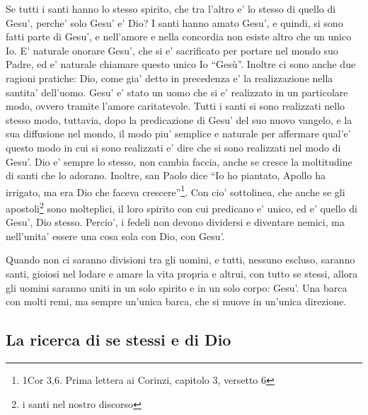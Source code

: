Se tutti i santi hanno lo stesso spirito, che tra l'altro e' lo stesso di quello di Gesu', perche' solo Gesu' e' Dio? 
I santi hanno amato Gesu', e quindi, si sono fatti parte di Gesu', e nell'amore e nella concordia non esiste altro che un unico Io. E' naturale onorare Gesu', che si e' sacrificato per portare nel mondo suo Padre, ed e' naturale chiamare questo unico Io ``Gesù''. Inoltre ci sono anche due ragioni pratiche: Dio, come gia' detto in precedenza e' la realizzazione nella santita' dell'uomo. Gesu' e' stato un uomo che si e' realizzato in un particolare modo, ovvero tramite l'amore caritatevole. Tutti i santi si sono realizzati nello stesso modo, tuttavia, dopo la predicazione di Gesu' del suo nuovo vangelo, e la sua diffusione nel mondo, il modo piu' semplice e naturale per affermare qual'e' questo modo in cui si sono realizzati e' dire che si sono realizzati nel modo di Gesu'. Dio e' sempre lo stesso, non cambia faccia, anche se cresce la moltitudine di santi che lo adorano.  Inoltre, san Paolo dice \enquote{Io ho piantato, Apollo ha irrigato, ma era Dio che faceva crescere}\footnote{1Cor 3,6. Prima lettera ai Corinzi, capitolo 3, versetto 6}. Con cio' sottolinea, che anche se gli apostoli\footnote{i santi nel nostro discorso} sono molteplici, il loro spirito con cui predicano e' unico, ed e' quello di Gesu', Dio stesso. Percio', i fedeli non devono dividersi e diventare nemici, ma nell'unita' essere una cosa sola con Dio, con Gesu'.

Quando non ci saranno divisioni tra gli uomini, e tutti, nessuno escluso, saranno santi, gioiosi nel lodare e amare la vita propria e altrui, con tutto se stessi, allora gli uomini saranno uniti in un solo spirito e in un solo corpo:  Gesu'. Una barca con molti remi, ma sempre un'unica barca, che si muove in un'unica direzione.

\subsection{La ricerca di se stessi e di Dio}
\label{laricerca}

